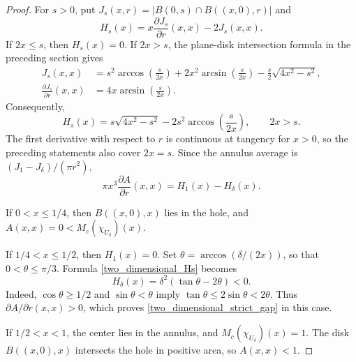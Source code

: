 \documentclass[12pt]{amsart}
\numberwithin{equation}{section}
\begin{document}
\begin{proof}
For $s>0$, put $J_s(x,r)=|B(0,s)\cap B((x,0),r)|$ and
\[
H_s(x)=x\frac{\partial J_s}{\partial r}(x,x)-2J_s(x,x).
\]
If $2x\leq s$, then $H_s(x)=0$. If $2x>s$, the
plane-disk intersection formula in the preceding section gives
\begin{align*}
J_s(x,x)
&=s^2\arccos\!\left(\frac{s}{2x}\right)
 +2x^2\arcsin\!\left(\frac{s}{2x}\right)
 -\frac{s}{2}\sqrt{4x^2-s^2},\\
\frac{\partial J_s}{\partial r}(x,x)
&=4x\arcsin\!\left(\frac{s}{2x}\right).
\end{align*}
Consequently,
\begin{equation}
\label{two_dimensional_Hs}
H_s(x)=s\sqrt{4x^2-s^2}
       -2s^2\arccos\!\left(\frac{s}{2x}\right),\qquad 2x>s.
\end{equation}
The first derivative with respect to $r$ is continuous at tangency
for $x>0$, so the preceding statements also cover $2x=s$.
Since the annulus average is $(J_1-J_\delta)/(\pi r^2)$,
\begin{equation}
\label{two_dimensional_diagonal_derivative}
\pi x^3\frac{\partial A}{\partial r}(x,x)=H_1(x)-H_\delta(x).
\end{equation}

If $0<x\leq1/4$, then $B((x,0),x)$ lies in the hole, and
$A(x,x)=0<M_c(\chi_{U_\delta})(x)$.

If $1/4<x\leq1/2$, then $H_1(x)=0$. Set
$\theta=\arccos(\delta/(2x))$, so that $0<\theta\leq\pi/3$.
Formula \eqref{two_dimensional_Hs} becomes
\[
H_\delta(x)=\delta^2(\tan\theta-2\theta)<0.
\]
Indeed, $\cos\theta\geq1/2$ and $\sin\theta<\theta$ imply
$\tan\theta\leq2\sin\theta<2\theta$.
Thus $\partial A/\partial r(x,x)>0$, which proves
\eqref{two_dimensional_strict_gap} in this case.

If $1/2<x<1$, the center lies in the annulus, and
$M_c(\chi_{U_\delta})(x)=1$. The disk $B((x,0),x)$ intersects the
hole in positive area, so $A(x,x)<1$.


\end{proof}
\end{document}

